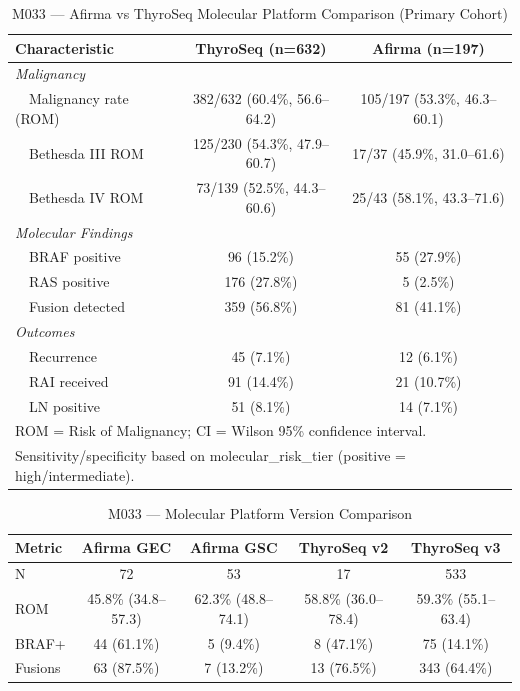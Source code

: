 
\begin{table}[!htbp]
\centering
\caption{M033 --- Afirma vs ThyroSeq Molecular Platform Comparison (Primary Cohort)}
\label{tab:m033_primary}
\begin{tabular}{lcc}
\toprule
\textbf{Characteristic} & \textbf{ThyroSeq} (n=632) & \textbf{Afirma} (n=197) \\
\midrule
\multicolumn{3}{l}{\textit{Malignancy}} \\
~~Malignancy rate (ROM) & 382/632 (60.4\%, 56.6--64.2) & 105/197 (53.3\%, 46.3--60.1) \\
~~Bethesda III ROM & 125/230 (54.3\%, 47.9--60.7) & 17/37 (45.9\%, 31.0--61.6) \\
~~Bethesda IV ROM & 73/139 (52.5\%, 44.3--60.6) & 25/43 (58.1\%, 43.3--71.6) \\

\midrule
\multicolumn{3}{l}{\textit{Molecular Findings}} \\
~~BRAF positive & 96 (15.2\%) & 55 (27.9\%) \\
~~RAS positive  & 176 (27.8\%) & 5 (2.5\%) \\
~~Fusion detected & 359 (56.8\%) & 81 (41.1\%) \\

\midrule
\multicolumn{3}{l}{\textit{Outcomes}} \\
~~Recurrence & 45 (7.1\%) & 12 (6.1\%) \\
~~RAI received & 91 (14.4\%) & 21 (10.7\%) \\
~~LN positive & 51 (8.1\%) & 14 (7.1\%) \\

\bottomrule
\multicolumn{3}{l}{\small ROM = Risk of Malignancy; CI = Wilson 95\% confidence interval.} \\
\multicolumn{3}{l}{\small Sensitivity/specificity based on molecular\_risk\_tier (positive = high/intermediate).} \\
\end{tabular}
\end{table}

\begin{table}[!htbp]
\centering
\caption{M033 --- Molecular Platform Version Comparison}
\label{tab:m033_version}
\begin{tabular}{lcccc}
\toprule
\textbf{Metric} & \textbf{Afirma GEC} & \textbf{Afirma GSC} & \textbf{ThyroSeq v2} & \textbf{ThyroSeq v3} \\
\midrule
N & 72 & 53 & 17 & 533 \\
ROM & 45.8\% (34.8--57.3) & 62.3\% (48.8--74.1) & 58.8\% (36.0--78.4) & 59.3\% (55.1--63.4) \\
BRAF+ & 44 (61.1\%) & 5 (9.4\%) & 8 (47.1\%) & 75 (14.1\%) \\
Fusions & 63 (87.5\%) & 7 (13.2\%) & 13 (76.5\%) & 343 (64.4\%) \\

\bottomrule
\end{tabular}
\end{table}
